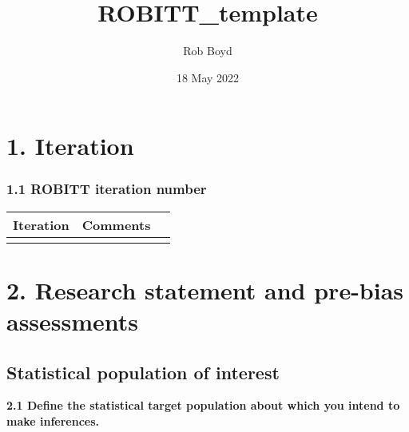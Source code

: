 \documentclass[]{article}
\title{ROBITT\_template}
\author{Rob Boyd}
\date{18 May 2022}
\begin{document}
\maketitle

\section{1. Iteration}\label{iteration}

\subsubsection{1.1 ROBITT iteration
number}\label{robitt-iteration-number}

\begin{longtable}[]{@{}lll@{}}
\toprule
Iteration & Comments &\tabularnewline
\midrule
\endhead
& &\tabularnewline
\bottomrule
\end{longtable}

\section{2. Research statement and pre-bias
assessments}\label{research-statement-and-pre-bias-assessments}

\subsection{Statistical population of
interest}\label{statistical-population-of-interest}

\textbf{2.1 Define the statistical target population about which you
intend to make inferences.}
\end{document}
